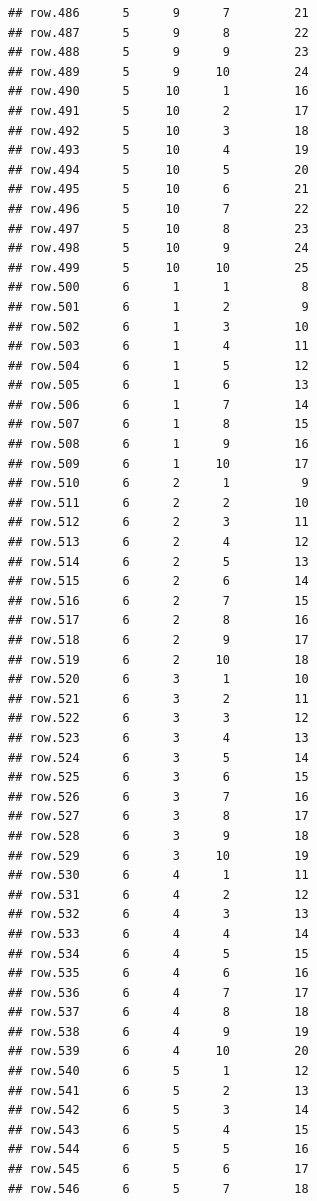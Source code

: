 \documentclass[
]{article}
\begin{document}
\begin{verbatim}
## row.486      5      9      7         21
## row.487      5      9      8         22
## row.488      5      9      9         23
## row.489      5      9     10         24
## row.490      5     10      1         16
## row.491      5     10      2         17
## row.492      5     10      3         18
## row.493      5     10      4         19
## row.494      5     10      5         20
## row.495      5     10      6         21
## row.496      5     10      7         22
## row.497      5     10      8         23
## row.498      5     10      9         24
## row.499      5     10     10         25
## row.500      6      1      1          8
## row.501      6      1      2          9
## row.502      6      1      3         10
## row.503      6      1      4         11
## row.504      6      1      5         12
## row.505      6      1      6         13
## row.506      6      1      7         14
## row.507      6      1      8         15
## row.508      6      1      9         16
## row.509      6      1     10         17
## row.510      6      2      1          9
## row.511      6      2      2         10
## row.512      6      2      3         11
## row.513      6      2      4         12
## row.514      6      2      5         13
## row.515      6      2      6         14
## row.516      6      2      7         15
## row.517      6      2      8         16
## row.518      6      2      9         17
## row.519      6      2     10         18
## row.520      6      3      1         10
## row.521      6      3      2         11
## row.522      6      3      3         12
## row.523      6      3      4         13
## row.524      6      3      5         14
## row.525      6      3      6         15
## row.526      6      3      7         16
## row.527      6      3      8         17
## row.528      6      3      9         18
## row.529      6      3     10         19
## row.530      6      4      1         11
## row.531      6      4      2         12
## row.532      6      4      3         13
## row.533      6      4      4         14
## row.534      6      4      5         15
## row.535      6      4      6         16
## row.536      6      4      7         17
## row.537      6      4      8         18
## row.538      6      4      9         19
## row.539      6      4     10         20
## row.540      6      5      1         12
## row.541      6      5      2         13
## row.542      6      5      3         14
## row.543      6      5      4         15
## row.544      6      5      5         16
## row.545      6      5      6         17
## row.546      6      5      7         18

\end{verbatim}
\end{document}
